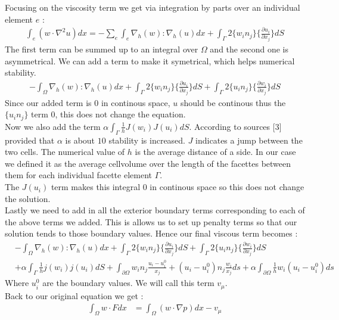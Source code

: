 \documentclass[11pt,twoside,a4paper]{article}
\begin{document}
Focusing on the viscosity term we get via integration by parts over an individual element $e$ :
\begin{align*}
\int_e (w \cdot \nabla^2 u) dx = - \sum_e \int_e \nabla_h(w) : \nabla_h(u) dx + \int_\Gamma 2 \{ w_i n_j \} \{ \frac{\partial u_i}{\partial x_j}\} dS
\end{align*}
The first term can be summed up to an integral over $\Omega$ and the second one is asymmetrical. We can add a term to make it symetrical, which helps numerical stability.
\begin{align*}
-  \int_\Omega \nabla_h(w) : \nabla_h(u) dx + \int_\Gamma 2 \{ w_i n_j \} \{ \frac{\partial u_i}{\partial x_j}\} dS + \int_\Gamma 2 \{ u_i n_j \} \{ \frac{\partial w_i}{\partial x_j}\} dS
\end{align*}
Since our added term is $0$ in continous space, $u$ should be continous thus the $ \{ u_i n_j \}$ term $0$, this does not change the equation.\\
Now we also add the term $\alpha \int_\Gamma \frac{1}{h}  J(w_i) J(u_i) dS$. According to sources [3] provided that  $\alpha$ is about $10$ stability is increased. $J$ indicates a jump between the two cells. The numerical value of $h$ is the average distance of a side. In our case we defined it as the average cellvolume over the length of the facettes between them for each individual facette element $\Gamma$.\\
The $J(u_i)$ term makes this integral $0$ in continous space so this does not change the solution.\\
 Lastly we need to add in all the exterior boundary terms corresponding to each of the above terms we added. This is allows us to set up penalty terms so that our solution tends to those boundary values. Hence our final viscous term becomes :\\
\begin{align*}
&-  \int_\Omega \nabla_h(w) : \nabla_h(u) dx + \int_\Gamma 2 \{ w_i n_j \} \{ \frac{\partial u_i}{\partial x_j}\} dS + \int_\Gamma 2 \{ u_i n_j \} \{ \frac{\partial w_i}{\partial x_j}\} dS \\
&+ \alpha \int_\Gamma \frac{1}{h}  j(w_i) j(u_i) dS + \int_{\partial  \Omega} w_i n_j \frac{u_i - u^0_i}{x_j} + (u_i - u^0_i) n_j\frac{w_i}{x_j} ds + \alpha \int_{\partial \Omega} \frac{1}{h} w_i(u_i-u^0_i)ds
\end{align*}
Where $u^0_i$ are the boundary values.
We will call this term $v_\mu$.\\
Back to our original equation we get : 
\begin{align}
\int_\Omega w \cdot F dx &= \int_\Omega (w \cdot \nabla p) dx - v_\mu
\end{align}
\end{document}
